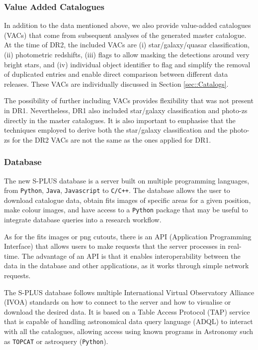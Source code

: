 \documentclass[fleqn,usenatbib]{mnras}
\begin{document}
\subsubsection{Value Added Catalogues}

In addition to the data mentioned above, we also provide value-added catalogues (VACs) that come from subsequent analyses of the generated master catalogue. At the time of DR2, the included VACs are (i) star/galaxy/quasar classification, (ii) photometric redshifts, (iii) flags to allow masking the detections around very bright stars, and (iv) individual object identifier to flag and simplify the removal of duplicated entries and enable direct comparison between different data releases. These VACs are individually discussed in Section \ref{sec::Catalogs}.

The possibility of further including VACs provides flexibility that was not present in DR1. Nevertheless, DR1 also included \mbox{star/galaxy} classification and photo-zs directly in the master catalogues. It is also important to emphasise that the techniques employed to derive both the star/galaxy classification and the photo-zs for the DR2 VACs are not the same as the ones applied for DR1.%


\subsubsection{Database}

The new S-PLUS database is a server built on multiple programming languages, from \texttt{Python}, \texttt{Java}, \texttt{Javascript} to \texttt{C/C++}. The database allows the user to download catalogue data, obtain fits images of specific areas for a given position, make colour images, and have access to a \texttt{Python} package that may be useful to integrate database queries into a research workflow.

As for the fits images or png cutouts, there is an API (Application Programming Interface) that allows users to make requests that the server processes in real-time. The advantage of an API is that it enables interoperability between the data in the database and other applications, as it works through simple network requests. 

The S-PLUS database follows multiple International Virtual Observatory Alliance (IVOA) standards on how to connect to the server and how to visualise or download the desired data. It is based on a Table Access Protocol (TAP) service that is capable of handling astronomical data query language (ADQL) to interact with all the catalogues, allowing access using known programs in Astronomy such as \texttt{TOPCAT} \citep[Tool for Operations on Catalogues And Tables;][]{2005ASPC..347...29T} or astroquery (\texttt{Python}). 
\end{document}
